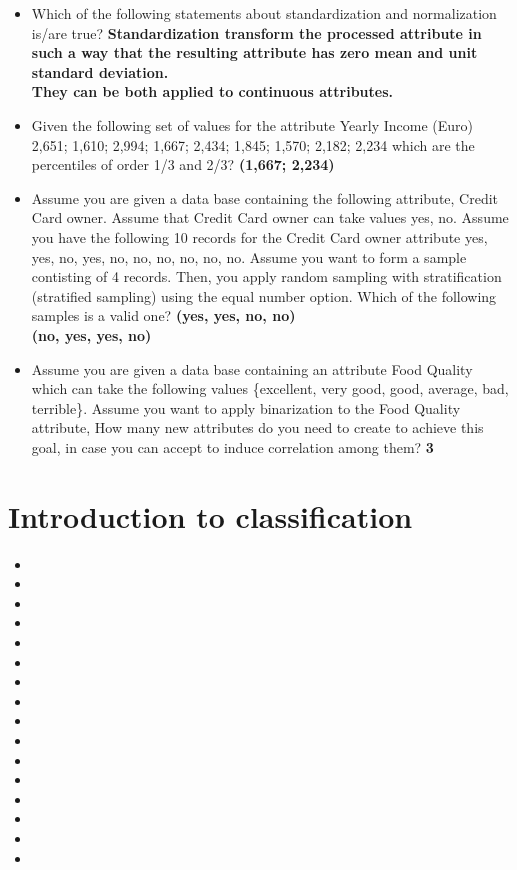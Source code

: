 \documentclass[12pt, a4paper,titlepage,openany]{article}
\begin{document}
\begin{itemize}
	\item Which of the following statements about standardization and normalization is/are true? \textbf{Standardization transform the processed attribute in such a way that the resulting attribute has zero mean and unit standard deviation. \\ They can be both applied to continuous attributes.}
	\item Given the following set of values for the attribute Yearly Income (Euro) {2,651; 1,610; 2,994; 1,667; 2,434; 1,845; 1,570; 2,182; 2,234} which are the percentiles of order 1/3 and 2/3? \textbf{(1,667; 2,234)}
	\item Assume you are given a data base containing the following attribute, Credit Card owner. Assume that Credit Card owner can take values {yes, no}. Assume you have the following 10 records for the Credit Card owner attribute {yes, yes, no, yes, no, no, no, no, no, no}. Assume you want to form a sample contisting of 4 records. Then, you apply random sampling with stratification (stratified sampling) using the equal number option. Which of the following samples is a valid one? \textbf{(yes, yes, no, no) \\ (no, yes, yes, no)}
	\item Assume you are given a data base containing an attribute Food Quality which can take the following values \{excellent, very good, good, average, bad, terrible\}. Assume you want to apply binarization to the Food Quality attribute, How many new attributes do you need to create to achieve this goal, in case you can accept to induce correlation among them? \textbf{3}

\end{itemize}
\section{Introduction to classification}
\begin{itemize}
	\item 
	\item
	\item
	\item
	\item 
	\item
	\item
	\item
	\item 
	\item
	\item
	\item
	\item 
	\item
	\item
	\item
\end{itemize}
\end{document}
